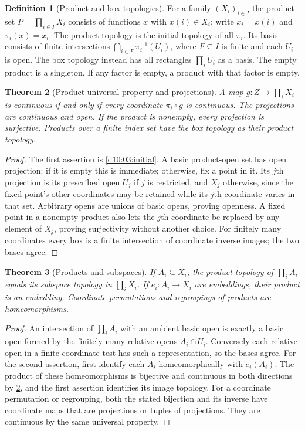 \documentclass[11pt,oneside,openany]{book}
\newtheorem{theorem}{Theorem}[chapter]
\theoremstyle{definition}
\newtheorem{definition}[theorem]{Definition}
\theoremstyle{remark}
\begin{document}
\begin{definition}[Product and box topologies]\label{d10:03:product}
For a family $(X_i)_{i\in I}$ the product set $P=\prod_{i\in I}X_i$ consists of functions $x$ with $x(i)\in X_i$; write $x_i=x(i)$ and $\pi_i(x)=x_i$. The product topology is the initial topology of all $\pi_i$. Its basis consists of finite intersections $\bigcap_{i\in F}\pi_i^{-1}(U_i)$, where $F\subseteq I$ is finite and each $U_i$ is open. The box topology instead has all rectangles $\prod_i U_i$ as a basis. The empty product is a singleton. If any factor is empty, a product with that factor is empty.
\end{definition}

\begin{theorem}[Product universal property and projections]\label{d10:03:product-universal}
A map $g:Z\to\prod_i X_i$ is continuous if and only if every coordinate $\pi_i\circ g$ is continuous. The projections are continuous and open. If the product is nonempty, every projection is surjective. Products over a finite index set have the box topology as their product topology.
\end{theorem}
\begin{proof}
The first assertion is \cref{d10:03:initial}. A basic product-open set has open projection: if it is empty this is immediate; otherwise, fix a point in it. Its $j$th projection is its prescribed open $U_j$ if $j$ is restricted, and $X_j$ otherwise, since the fixed point's other coordinates may be retained while its $j$th coordinate varies in that set. Arbitrary opens are unions of basic opens, proving openness. A fixed point in a nonempty product also lets the $j$th coordinate be replaced by any element of $X_j$, proving surjectivity without another choice. For finitely many coordinates every box is a finite intersection of coordinate inverse images; the two bases agree.
\end{proof}

\begin{theorem}[Products and subspaces]\label{d10:03:product-subspaces}
If $A_i\subseteq X_i$, the product topology of $\prod_i A_i$ equals its subspace topology in $\prod_i X_i$. If $e_i:A_i\to X_i$ are embeddings, their product is an embedding. Coordinate permutations and regroupings of products are homeomorphisms.
\end{theorem}
\begin{proof}
An intersection of $\prod_i A_i$ with an ambient basic open is exactly a basic open formed by the finitely many relative opens $A_i\cap U_i$. Conversely each relative open in a finite coordinate test has such a representation, so the bases agree. For the second assertion, first identify each $A_i$ homeomorphically with $e_i(A_i)$. The product of these homeomorphisms is bijective and continuous in both directions by \cref{d10:03:product-universal}, and the first assertion identifies its image topology. For a coordinate permutation or regrouping, both the stated bijection and its inverse have coordinate maps that are projections or tuples of projections. They are continuous by the same universal property.
\end{proof}
\end{document}
